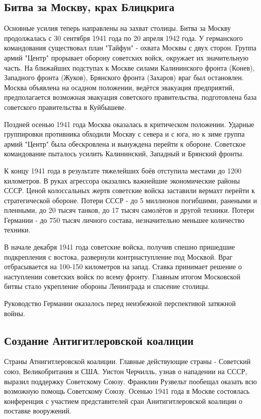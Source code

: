 \subsection{Битва за Москву, крах Блицкрига}

Основные усилия теперь направлены на захват столицы. Битва за Москву продолжалась с 30 сентября 1941 года по 20 апреля 1942 года. У германского командования существовал план "Тайфун" - охвата Москвы с двух сторон. Группа армий "Центр" прорывает оборону советских войск, окружает их значительную часть. На ближайших подступах к Москве силами Калининского фронта (Конев), Западного фронта (Жуков), Брянского фронта (Захаров) враг был остановлен. Москва объявлена на осадном положении, ведётся эвакуация предприятий, предполагается возможная эвакуация советского правительства, подготовлена база советского правительства в Куйбышеве.

Поздней осенью 1941 года Москва оказалась в критическом положении. Ударные группировки противника обходили Москву с севера и с юга, но к зиме группа армий "Центр" была обескровлена и вынуждена перейти к обороне. Советское командование пыталось усилить Калининский, Западный и Брянский фронты.

К концу 1941 года в результате тяжелейших боёв отступила местами до 1200 километров. В руках агрессора оказались важнейшие экономические районы СССР. Ценой колоссальных жертв советские войска заставили вермахт перейти к стратегической обороне. Потери СССР - до 5 миллионов погибшими, ранеными и пленными, до 20 тысяч танков, до 17 тысяч самолётов и другой техники. Потери Германии - до 750 тысяч личного состава, незначительно меньшее количество техники.

В начале декабря 1941 года советские войска, получив спешно пришедшие подкрепления с востока, развернули контрнаступление под Москвой. Враг отбрасывается на 100-150 километров на запад. Ставка принимает решение о наступлении советских войск по всему фронту. Главным итогом Московской битвы стало укрепление обороны Ленинграда и спасение столицы.

Руководство Германии оказалось перед неизбежной перспективой затяжной войны.

\subsection{Создание Антигитлеровской коалиции}
Страны Атнигитлеровской коалиции. Главные действующие страны - Советский союз, Великобритания и США. Уистон Черчилль, узнав о нападении на СССР, выразил поддержку Советскому Союзу. Франклин Рузвельт пообещал оказать всю возможную помощь Советскому Союзу. Осенью 1941 года в Москве состоялась конференция с участием представителей сран Анитигитлеровской коалиции о поставке вооружений.




